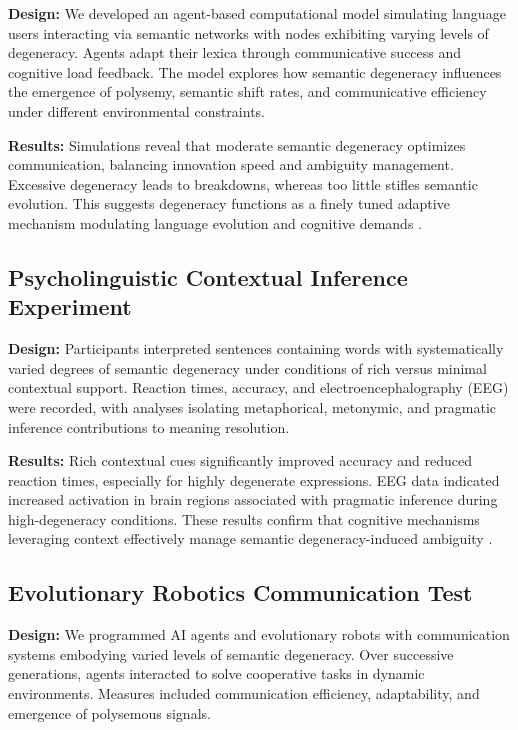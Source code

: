 \documentclass[12pt,a4paper]{article}
\begin{document}
\textbf{Design:} We developed an agent-based computational model simulating language users interacting via semantic networks with nodes exhibiting varying levels of degeneracy. Agents adapt their lexica through communicative success and cognitive load feedback. The model explores how semantic degeneracy influences the emergence of polysemy, semantic shift rates, and communicative efficiency under different environmental constraints.

\textbf{Results:} Simulations reveal that moderate semantic degeneracy optimizes communication, balancing innovation speed and ambiguity management. Excessive degeneracy leads to breakdowns, whereas too little stifles semantic evolution. This suggests degeneracy functions as a finely tuned adaptive mechanism modulating language evolution and cognitive demands \cite{citation_needed}.

\subsection{Psycholinguistic Contextual Inference Experiment}

\textbf{Design:} Participants interpreted sentences containing words with systematically varied degrees of semantic degeneracy under conditions of rich versus minimal contextual support. Reaction times, accuracy, and electroencephalography (EEG) were recorded, with analyses isolating metaphorical, metonymic, and pragmatic inference contributions to meaning resolution.

\textbf{Results:} Rich contextual cues significantly improved accuracy and reduced reaction times, especially for highly degenerate expressions. EEG data indicated increased activation in brain regions associated with pragmatic inference during high-degeneracy conditions. These results confirm that cognitive mechanisms leveraging context effectively manage semantic degeneracy-induced ambiguity \cite{citation_needed}.

\subsection{Evolutionary Robotics Communication Test}

\textbf{Design:} We programmed AI agents and evolutionary robots with communication systems embodying varied levels of semantic degeneracy. Over successive generations, agents interacted to solve cooperative tasks in dynamic environments. Measures included communication efficiency, adaptability, and emergence of polysemous signals.
\end{document}
